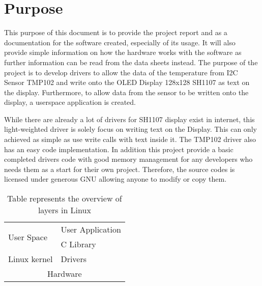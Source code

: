 \section{Purpose}
This purpose of this document is to provide the project report and as a documentation for the software created, especially of its usage. It will also provide simple information on how the hardware works with the software as further information can be read from the data sheets instead. The purpose of the project is to develop drivers to allow the data of the temperature from I2C Sensor TMP102 and write onto the OLED Display 128x128 SH1107 as text on the display. Furthermore, to allow data from the sensor to be written onto the display, a userspace application is created.

While there are already a lot of drivers for SH1107 display exist in internet, this light-weighted driver is solely focus on writing text on the Display. This can only achieved as simple as use write calls with text inside it. The TMP102 driver also has an easy code implementation. In addition this project provide a basic completed drivers code with good memory management for any developers who needs them as a start for their own project. Therefore, the source codes is licensed under generous GNU allowing anyone to modify or copy them.

\begin{table}[]
	\centering
\begin{tabular}{|lllll|}
	\hline
	\multicolumn{1}{|l|}{\multirow{2}{*}{User Space}} & 					\multicolumn{4}{l|}{User Application} \\ \cline{2-5} 
	\multicolumn{1}{|l|}{}                            & 					\multicolumn{4}{l|}{C Library}        \\ \hline
	\multicolumn{1}{|l|}{Linux kernel}                & 					\multicolumn{4}{l|}{Drivers}          \\ \hline
	\multicolumn{5}{|c|}{Hardware}                                                            	\\ \hline
\end{tabular}
\caption{Table represents the overview of layers in Linux}
\label{tab:table1}
\end{table}
